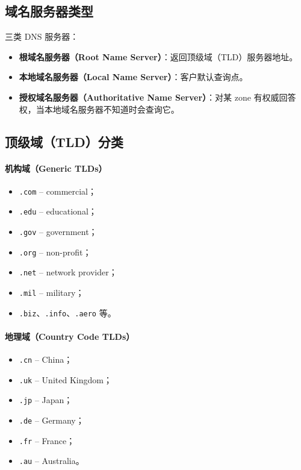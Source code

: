 \subsection{域名服务器类型}

三类 DNS 服务器：
\begin{itemize}
  \item \textbf{根域名服务器（Root Name Server）}：返回顶级域（TLD）服务器地址。
  \item \textbf{本地域名服务器（Local Name Server）}：客户默认查询点。
  \item \textbf{授权域名服务器（Authoritative Name Server）}：对某 zone 有权威回答权，当本地域名服务器不知道时会查询它。
\end{itemize}

\subsection{顶级域（TLD）分类}

\paragraph{机构域（Generic TLDs）}
\begin{itemize}
  \item \texttt{.com} -- commercial；
  \item \texttt{.edu} -- educational；
  \item \texttt{.gov} -- government；
  \item \texttt{.org} -- non-profit；
  \item \texttt{.net} -- network provider；
  \item \texttt{.mil} -- military；
  \item \texttt{.biz}、\texttt{.info}、\texttt{.aero} 等。
\end{itemize}

\paragraph{地理域（Country Code TLDs）}
\begin{itemize}
  \item \texttt{.cn} -- China；
  \item \texttt{.uk} -- United Kingdom；
  \item \texttt{.jp} -- Japan；
  \item \texttt{.de} -- Germany；
  \item \texttt{.fr} -- France；
  \item \texttt{.au} -- Australia。
\end{itemize}

